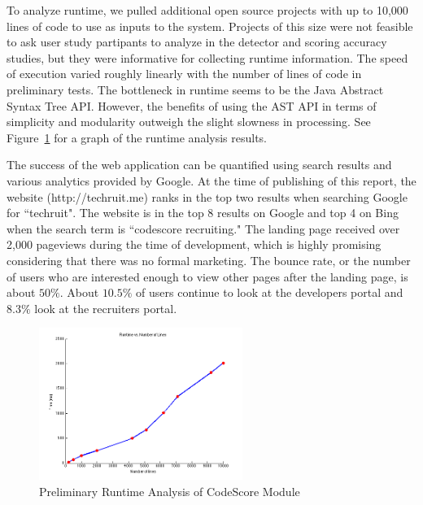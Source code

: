 \documentclass{sig-alternate}
\begin{document}
To analyze runtime, we pulled additional open source projects with up to
10,000 lines of code to use as inputs to the system. Projects of this size were not feasible to ask user study
partipants to analyze in the detector and scoring accuracy studies, but they were informative for collecting runtime information. The speed of execution varied roughly linearly with the number of lines of code in
preliminary tests. The bottleneck in runtime seems to be the Java Abstract
Syntax Tree API. However, the benefits of using the AST API in terms of simplicity and
modularity outweigh the slight slowness in processing. See Figure~\ref{fig:runtime} for a graph of the runtime analysis results.

The success of the web application can be quantified using search results and various analytics
provided by Google. At the time of publishing of this report, the website
(http://techruit.me) ranks in 
the top two results when searching Google for ``techruit". The website is in the
top 8 results on
Google and top 4 on Bing when the search term is ``codescore recruiting." The
landing page received over 2,000 pageviews during the time of development, which
is highly promising considering that there was no formal marketing. The bounce
rate, or the number of users who are interested enough to view other pages after
the landing page, is about $50\%$. About $10.5\%$ of users continue to look at
the developers portal and $8.3\%$ look at the recruiters portal.


\begin{figure}[ht]
	\begin{center}
		\includegraphics[width=250px]{runtimePlot}
	\end{center}
	\vspace{-12pt}
	\caption{Preliminary Runtime Analysis of CodeScore Module}
	\label{fig:runtime}
\end{figure}
\end{document}
